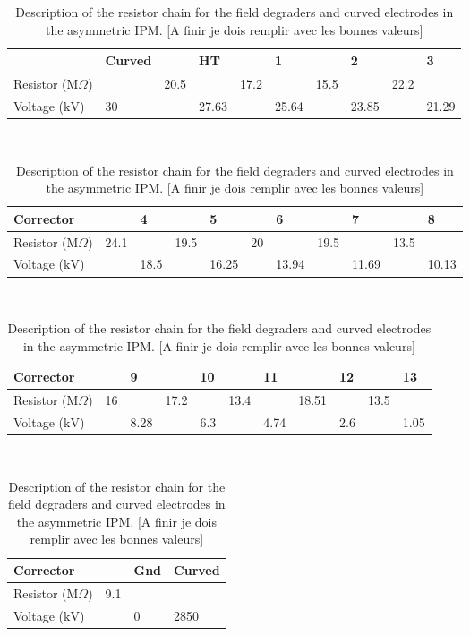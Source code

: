 \begin{table}[ht]
  \centering
  \caption[Description of the resistor chain for the field degraders and curved electrodes in the asymmetric IPM]
  {Description of the resistor chain for the field degraders and curved electrodes in the asymmetric IPM. [A finir je dois remplir avec les bonnes valeurs]}
  \label{chap3:resistor_asym}
  \begin{tabular}{llllllllll}
    \toprule
                                    & Curved &      & HT    &      & 1     &      & 2    &      & 3    \\
    \midrule
    Resistor (\(\mathrm{M}\Omega\)) &        & 20.5 &       & 17.2 &       & 15.5 &      & 22.2        \\
    Voltage (\(\mathrm{kV}\))       & 30     &      & 27.63 &      & 25.64 &      & 23.85 &      & 21.29 \\
    \bottomrule
  \end{tabular}
  \\
  \medskip
  \begin{tabular}{lllllllllll}
    \toprule
    Corrector                       &      & 4  &      & 5  &    & 6  &      & 7  &      & 8  \\
    \midrule
    Resistor (\(\mathrm{M}\Omega\)) & 24.1 &    & 19.5 &    & 20 &    & 19.5 &    & 13.5      \\
    Voltage (\(\mathrm{kV}\))       &      & 18.5 &      & 16.25 &    & 13.94 &      & 11.69 &      & 10.13 \\
    \bottomrule
  \end{tabular}
  \\
  \medskip
  \begin{tabular}{lllllllllll}
    \toprule
    Corrector                       &    & 9  &      & 10 &      & 11 &       & 12 &      & 13 \\
    \midrule
    Resistor (\(\mathrm{M}\Omega\)) & 16 &    & 17.2 &    & 13.4 &    & 18.51 &    & 13.5      \\
    Voltage (\(\mathrm{kV}\))       &    & 8.28 &      & 6.3 &      & 4.74 &       & 2.6 &      & 1.05 \\
    \bottomrule
  \end{tabular}
  \\
  \medskip
  \begin{tabular}{llll}
    \toprule
    Corrector                       &     & Gnd & Curved \\
    \midrule
    Resistor (\(\mathrm{M}\Omega\)) & 9.1 &     &        \\
    Voltage (\(\mathrm{kV}\))       &     & 0  & 2850      \\
    \bottomrule
  \end{tabular}

\end{table}